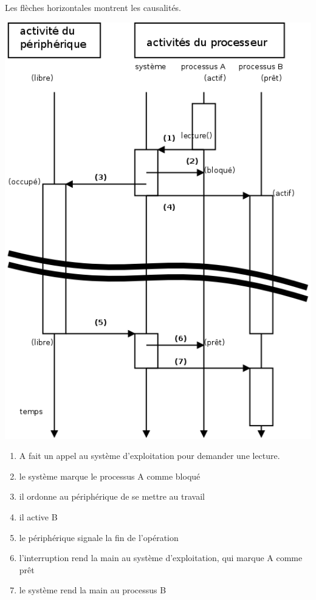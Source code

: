 \begin{multicols}{2}
Les flèches horizontales montrent les causalités.

\begin{center}
\includegraphics[width=\linewidth]{Figures/deroulement-es.png}
\end{center}

\begin{enumerate}
\item A fait un appel au système d'exploitation pour demander une
  lecture.
\item le système marque le processus A comme bloqué
\item il ordonne au périphérique de se mettre au travail
\item il active B
\item le périphérique signale la fin de l'opération
\item l'interruption rend la main au système d'exploitation,
qui marque A comme prêt
\item le système rend la main au processus B
\end{enumerate}



\end{multicols}
